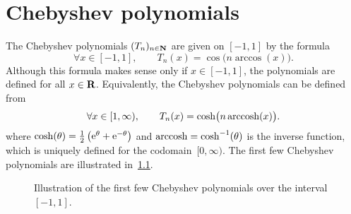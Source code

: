 \chapter{Chebyshev polynomials}%
\label{cha:Chebyshev polynomials}

The Chebyshev polynomials $(T_n)_{n \in \mathbf N}$ are given on $[-1, 1]$ by the formula
\begin{equation}
    \label{eq:chebyshev}
    \forall x \in [-1, 1], \qquad
    T_n(x) = \cos \bigl(n \arccos(x)\bigr).
\end{equation}
Although this formula makes sense only if $x \in [-1, 1]$,
the polynomials are defined for all $x \in \mathbf R$.
Equivalently,
the Chebyshev polynomials can be defined from
\begin{equation}
    \label{eq:chebyshev_cosh}
    \forall x \in [1, \infty), \qquad
    T_n(x) = \cosh \bigl(n \operatorname{arccosh}(x)\bigr).
\end{equation}
where $\cosh(\theta) = \frac{1}{2} \left( \mathrm e^\theta + \mathrm e^{-\theta} \right)$ and $\operatorname{arccosh} = \cosh^{-1}(\theta)$ is the inverse function,
which is uniquely defined for the codomain~$[0, \infty)$.
The first few Chebyshev polynomials are illustrated in~\cref{fig:chebyshev}.

\begin{figure}
    \centering
    \caption{Illustration of the first few Chebyshev polynomials over the interval $[-1, 1]$.}
    \label{fig:chebyshev}
\end{figure}

